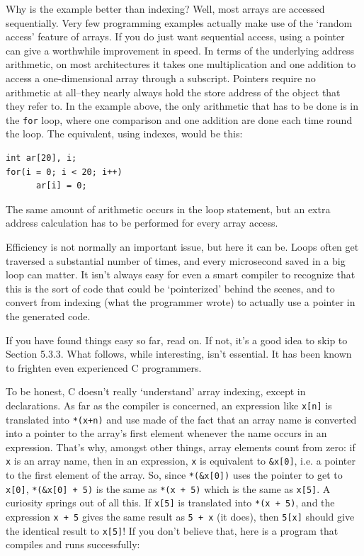    Why is the example better than indexing? Well, most arrays are
    accessed sequentially. Very few programming examples actually make use
    of the `random access' feature of arrays. If you do just want
    sequential access, using a pointer can give a worthwhile improvement in
    speed. In terms of the underlying address arithmetic, on most
    architectures it takes one multiplication and one addition to access
    a one-dimensional array through a subscript. Pointers require no
    arithmetic at all--they nearly always hold the store address of the
    object that they refer to. In the example above, the only arithmetic
    that has to be done is in the \texttt{for} loop, where one
    comparison and one addition are done each time round the loop. The
    equivalent, using indexes, would be this:


   \begin{Verbatim}
int ar[20], i;
for(i = 0; i < 20; i++)
      ar[i] = 0;
\end{Verbatim}

   The same amount of arithmetic occurs in the loop statement, but an
    extra address calculation has to be performed for every array
    access.


   Efficiency is not normally an important issue, but here it can be.
    Loops often get traversed a substantial number of times, and every
    microsecond saved in a big loop can matter. It isn't always easy for
    even a smart compiler to recognize that this is the sort of code that
    could be `pointerized' behind the scenes, and to convert from
    indexing (what the programmer wrote) to actually use a pointer in the
    generated code.


   If you have found things easy so far, read on. If not, it's a good
    idea to skip to Section 5.3.3. What follows, while
    interesting, isn't essential. It has been known to frighten even
    experienced C programmers.


   To be honest, C doesn't really `understand' array indexing,
    except in declarations. As far as the compiler is concerned, an
    expression like \texttt{x[n]} is translated into \texttt{*(x+n)}
    and use made of the fact that an array name is converted into a pointer
    to the array's first element whenever the name occurs in an expression.
    That's why, amongst other things, array elements count from zero: if
    \texttt{x} is an array name, then in an expression, \texttt{x}
    is equivalent to \texttt{\&x[0]}, i.e. a pointer to the first
    element of the array. So, since \texttt{*(\&x[0])} uses the
    pointer to get to \texttt{x[0]}, \texttt{*(\&x[0] + 5)} is
    the same as \texttt{*(x + 5)} which is the same as
    \texttt{x[5]}. A curiosity springs out of all this. If
    \texttt{x[5]} is translated into \texttt{*(x + 5)}, and the
    expression \texttt{x + 5} gives the same result as \texttt{5
    + x} (it does), then \texttt{5[x]} should give the identical
    result to \texttt{x[5]}! If you don't believe that, here is
    a program that compiles and runs successfully:


